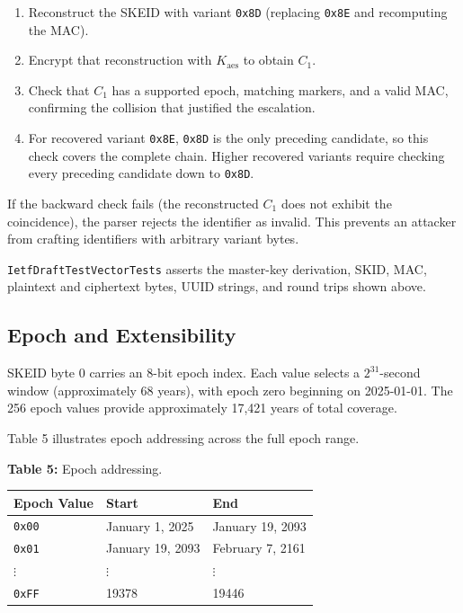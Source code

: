 \documentclass[a4paper,fleqn]{cas-sc}
\newcounter{none}
\providecommand{\tightlist}{%
  \setlength{\itemsep}{0pt}\setlength{\parskip}{0pt}}
\begin{document}
\begin{enumerate}
\def\labelenumi{\arabic{enumi}.}
\tightlist
\item
  Reconstruct the SKEID with variant \texttt{0x8D} (replacing
  \texttt{0x8E} and recomputing the MAC).
\item
  Encrypt that reconstruction with \(K_{\mathrm{aes}}\) to obtain
  \(C_1\).
\item
  Check that \(C_1\) has a supported epoch, matching markers, and a
  valid MAC, confirming the collision that justified the escalation.
\item
  For recovered variant \texttt{0x8E}, \texttt{0x8D} is the only
  preceding candidate, so this check covers the complete chain. Higher
  recovered variants require checking every preceding candidate down to
  \texttt{0x8D}.
\end{enumerate}

If the backward check fails (the reconstructed \(C_1\) does not exhibit
the coincidence), the parser rejects the identifier as invalid. This
prevents an attacker from crafting identifiers with arbitrary variant
bytes.

\texttt{IetfDraftTestVectorTests} asserts the master-key derivation,
SKID, MAC, plaintext and ciphertext bytes, UUID strings, and round trips
shown above.

\subsection{Epoch and Extensibility}\label{epoch-and-extensibility}

SKEID byte 0 carries an 8-bit epoch index. Each value selects a
\(2^{31}\)-second window (approximately 68 years), with epoch zero
beginning on 2025-01-01. The 256 epoch values provide approximately
17,421 years of total coverage.

Table 5 illustrates epoch addressing across the full epoch range.

\textbf{Table 5:} Epoch addressing.

{\def\LTcaptype{none} %
\begin{longtable}[]{@{}lll@{}}
\toprule\noalign{}
Epoch Value & Start & End \\
\midrule\noalign{}
\endhead
\bottomrule\noalign{}
\endlastfoot
\texttt{0x00} & January 1, 2025 & January 19, 2093 \\
\texttt{0x01} & January 19, 2093 & February 7, 2161 \\
\(\vdots\) & \(\vdots\) & \(\vdots\) \\
\texttt{0xFF} & 19378 & 19446 \\
\end{longtable}
}
\end{document}
